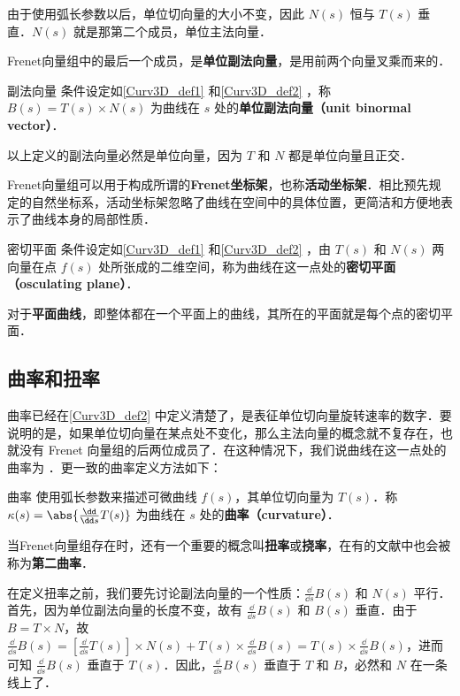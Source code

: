 由于使用弧长参数以后，单位切向量的大小不变，因此 $N(s)$ 恒与 $T(s)$ 垂直．$N(s)$ 就是那第二个成员，单位主法向量．

Frenet向量组中的最后一个成员，是\textbf{单位副法向量}，是用前两个向量叉乘而来的．

\begin{definition}{副法向量}
条件设定如\autoref{Curv3D_def1} 和\autoref{Curv3D_def2} ，称 $B(s)=T(s)\times N(s)$ 为曲线在 $s$ 处的\textbf{单位副法向量（unit binormal vector）}．
\end{definition}

以上定义的副法向量必然是单位向量，因为 $T$ 和 $N$ 都是单位向量且正交．

Frenet向量组可以用于构成所谓的\textbf{Frenet坐标架}，也称\textbf{活动坐标架}．相比预先规定的自然坐标系，活动坐标架忽略了曲线在空间中的具体位置，更简洁和方便地表示了曲线本身的局部性质．

\begin{definition}{密切平面}
条件设定如\autoref{Curv3D_def1} 和\autoref{Curv3D_def2} ，由 $T(s)$ 和 $N(s)$ 两向量在点 $f(s)$ 处所张成的二维空间，称为曲线在这一点处的\textbf{密切平面（osculating plane）}．
\end{definition}

对于\textbf{平面曲线}，即整体都在一个平面上的曲线，其所在的平面就是每个点的密切平面．

\subsection{曲率和扭率}

曲率已经在\autoref{Curv3D_def2} 中定义清楚了，是表征单位切向量旋转速率的数字．要说明的是，如果单位切向量在某点处不变化，那么主法向量的概念就不复存在，也就没有 Frenet 向量组的后两位成员了．在这种情况下，我们说曲线在这一点处的曲率为 ．更一致的曲率定义方法如下：
\begin{definition}{曲率}
使用弧长参数来描述可微曲线 $f(s)$，其单位切向量为 $T(s)$．称 $\kappa(s)=\abs{\frac{\dd}{\dd s}T(s)}$ 为曲线在 $s$ 处的\textbf{曲率（curvature）}．
\end{definition}

当Frenet向量组存在时，还有一个重要的概念叫\textbf{扭率}或\textbf{挠率}，在有的文献中也会被称为\textbf{第二曲率}．

在定义扭率之前，我们要先讨论副法向量的一个性质：$\frac{\dd}{\dd s}B(s)$ 和 $N(s)$ 平行．首先，因为单位副法向量的长度不变，故有 $\frac{\dd}{\dd s}B(s)$ 和 $B(s)$ 垂直．由于 $B=T\times N$，故 $\frac{\dd}{\dd s}B(s)=[\frac{\dd}{\dd s}T(s)]\times N(s)+T(s)\times\frac{\dd}{\dd s}B(s)=T(s)\times\frac{\dd}{\dd s}B(s)$，进而可知 $\frac{\dd}{\dd s}B(s)$ 垂直于 $T(s)$．因此，$\frac{\dd}{\dd s}B(s)$ 垂直于 $T$ 和 $B$，必然和 $N$ 在一条线上了．

